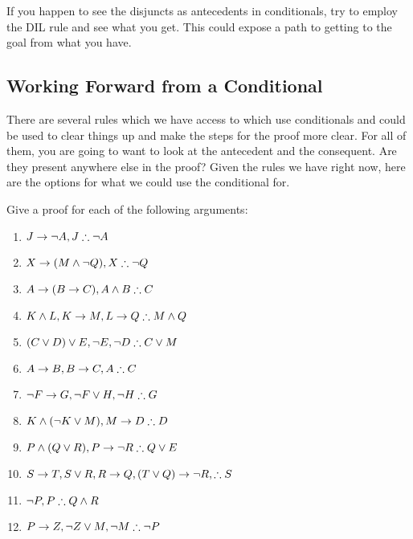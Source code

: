 If you happen to see the disjuncts as antecedents in conditionals, try to employ the DIL rule and see what you get. This could expose a path to getting to the goal from what you have. 

\subsection{Working Forward from a Conditional}

There are several rules which we have access to which use conditionals and could be used to clear things up and make the steps for the proof more clear. For all of them, you are going to want to look at the antecedent and the consequent. Are they present anywhere else in the proof? Given the rules we have right now, here are the options for what we could use the conditional for.

\practiceproblems
\problempart
\label{pr.solvesimplePLproofs}
Give a proof for each of the following arguments:
\begin{enumerate}
\item $J\eif\enot A, J \therefore \enot A$
\item $X\eif(M\eand\enot Q),X \therefore \enot Q$
\item $A\eif (B\eif C),A\eand B \therefore C$
\item $K\eand L,K\eif M,L\eif Q \therefore M\eand Q$
\item $(C\eor D)\eor E,\enot E,\enot D \therefore C\eor M$
\item $A\eif B, B\eif C, A \therefore C$
\item $\enot F\eif G, \enot F\eor H, \enot H \therefore G$
\item $K \eand (\enot K\eor M), M\eif D \therefore D$
\item $P \eand (Q\eor R), P\eif \enot R \therefore Q\eor E$
\item $S\eif T,S\eor R,R\eif Q,(T\eor Q)\eif \enot R, \therefore S$
\item $\enot P, P \therefore Q\eand R$
\item $P\eif Z,\enot Z\eor M,\enot M \therefore \enot P$
\end{enumerate}
